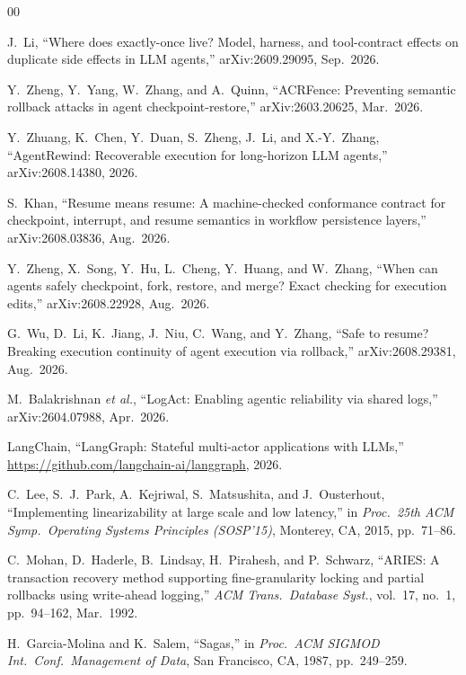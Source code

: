 \documentclass[10pt,journal,compsoc]{IEEEtran}
\begin{document}
\begin{thebibliography}{00}

J.~Li, ``Where does exactly-once live? Model, harness, and
tool-contract effects on duplicate side effects in LLM agents,''
arXiv:2609.29095, Sep.\ 2026.

Y.~Zheng, Y.~Yang, W.~Zhang, and A.~Quinn, ``ACRFence:
Preventing semantic rollback attacks in agent
checkpoint-restore,'' arXiv:2603.20625, Mar.\ 2026.

Y.~Zhuang, K.~Chen, Y.~Duan, S.~Zheng, J.~Li, and X.-Y.~Zhang,
``AgentRewind: Recoverable execution for long-horizon LLM
agents,'' arXiv:2608.14380, 2026.

S.~Khan, ``Resume means resume: A machine-checked conformance
contract for checkpoint, interrupt, and resume semantics in
workflow persistence layers,'' arXiv:2608.03836, Aug.\ 2026.

Y.~Zheng, X.~Song, Y.~Hu, L.~Cheng, Y.~Huang, and W.~Zhang,
``When can agents safely checkpoint, fork, restore, and merge?
Exact checking for execution edits,'' arXiv:2608.22928,
Aug.\ 2026.

G.~Wu, D.~Li, K.~Jiang, J.~Niu, C.~Wang, and Y.~Zhang, ``Safe to
resume? Breaking execution continuity of agent execution via
rollback,'' arXiv:2608.29381, Aug.\ 2026.

M.~Balakrishnan \emph{et al.}, ``LogAct: Enabling agentic
reliability via shared logs,'' arXiv:2604.07988, Apr.\ 2026.

LangChain, ``LangGraph: Stateful multi-actor applications with
LLMs,'' \url{https://github.com/langchain-ai/langgraph}, 2026.

C.~Lee, S.~J.~Park, A.~Kejriwal, S.~Matsushita, and
J.~Ousterhout, ``Implementing linearizability at large scale
and low latency,'' in \emph{Proc.\ 25th ACM Symp.\ Operating
Systems Principles (SOSP'15)}, Monterey, CA, 2015, pp.\ 71--86.

C.~Mohan, D.~Haderle, B.~Lindsay, H.~Pirahesh, and P.~Schwarz,
``ARIES: A transaction recovery method supporting
fine-granularity locking and partial rollbacks using
write-ahead logging,'' \emph{ACM Trans.\ Database Syst.},
vol.~17, no.~1, pp.\ 94--162, Mar.\ 1992.

H.~Garcia-Molina and K.~Salem, ``Sagas,'' in \emph{Proc.\ ACM
SIGMOD Int.\ Conf.\ Management of Data}, San Francisco, CA,
1987, pp.\ 249--259.

\end{thebibliography}
\end{document}
